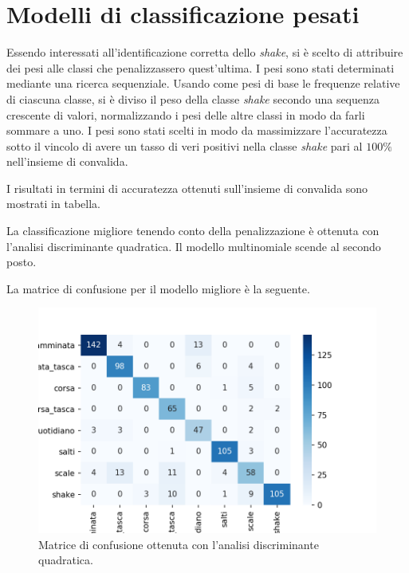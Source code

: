 \documentclass[main.tex]{subfiles}
\begin{document}
\section{Modelli di classificazione pesati}

Essendo interessati all\rq{}identificazione corretta dello {\em shake}, si è scelto di attribuire dei pesi alle classi che penalizzassero quest\rq{}ultima. I pesi sono stati determinati mediante una ricerca sequenziale. Usando come pesi di base le frequenze relative di ciascuna classe, si è diviso il peso della classe {\em shake} secondo una sequenza crescente di valori, normalizzando i pesi delle altre classi in modo da farli sommare a uno. I pesi sono stati scelti in modo da massimizzare l\rq{}accuratezza sotto il vincolo di avere un tasso di veri positivi nella classe {\em shake} pari al $100\%$ nell\rq{}insieme di convalida.

I risultati in termini di accuratezza ottenuti sull\rq{}insieme di convalida sono mostrati in tabella.


La classificazione migliore tenendo conto della penalizzazione è ottenuta con l\rq{}analisi discriminante quadratica. Il modello multinomiale scende al secondo posto.

La matrice di confusione per il modello migliore è la seguente.
\begin{figure}[H]
	\centering
	\includegraphics[width=.5\textwidth]{../../figure/confusionMatrix-QDA-penalizzata.png}
	\caption{Matrice di confusione ottenuta con l'analisi discriminante quadratica.}
	\label{fig:qda_pen}
\end{figure}
\end{document}
